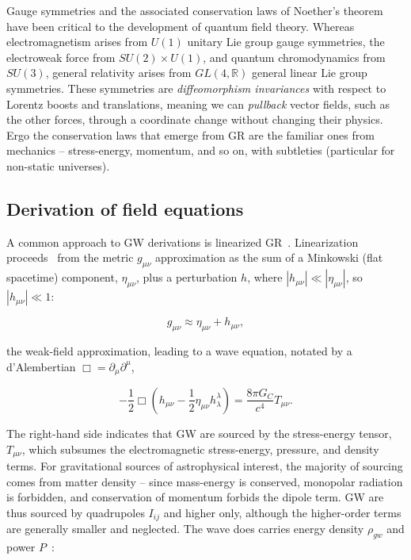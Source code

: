 Gauge symmetries and the associated conservation laws of Noether's theorem have been critical to the development of quantum field theory. 
Whereas electromagnetism arises from $U(1)$ unitary Lie group gauge symmetries, the electroweak force from $SU(2) \times U(1)$, and quantum chromodynamics from $SU(3)$, general relativity arises from $GL(4, \mathbb{R})$ general linear Lie group symmetries. 
These symmetries are \textit{diffeomorphism invariances} with respect to Lorentz boosts and translations, meaning we can \textit{pullback} vector fields, such as the other forces, through a coordinate change without changing their physics.
Ergo the conservation laws that emerge from GR are the familiar ones from mechanics -- stress-energy, momentum, and so on, with subtleties (particular for non-static universes).



        \subsection{Derivation of field equations}
        \label{field_equations}

            A common approach to GW derivations is linearized GR~\cite{FlanaganHughes2005}.
            Linearization proceeds~\cite{AdhikariThesis} from the metric $g_{\mu\nu}$ approximation as the sum of a Minkowski (flat spacetime) component, $\eta_{\mu\nu}$, plus a perturbation $h$, where $|h_{\mu\nu}| \ll |\eta_{\mu\nu}|$, so $|h_{\mu\nu}| \ll 1$:

\begin{equation}
g_{\mu \nu} \approx \eta_{\mu \nu} + h_{\mu \nu},
\label{perturbation_eq}
\end{equation}

\noindent the weak-field approximation, leading to a wave equation, notated by a d'Alembertian $\Box = \partial_\mu \partial^\mu$,

\begin{equation}
-\frac{1}{2} \Box \left(h_{\mu \nu} - \frac{1}{2} \eta_{\mu \nu} h_{\lambda}^{\lambda} \right) = \frac{8 \pi G_C}{c^4} T_{\mu \nu}.
\label{Ballmer_wave_eq}
\end{equation}

The right-hand side indicates that GW are sourced by the stress-energy tensor, $T_{\mu\nu}$, which subsumes the electromagnetic stress-energy, pressure, and density terms. 
For gravitational sources of astrophysical interest, the majority of sourcing comes from matter density -- since mass-energy is conserved, monopolar radiation is forbidden, and conservation of momentum forbids the dipole term. 
GW are thus sourced by quadrupoles $I_{ij}$ and higher only, although the higher-order terms are generally smaller and neglected. 
The wave does carries energy density $\rho_{gw}$ and power $P$~\cite{BallmerThesis}:

